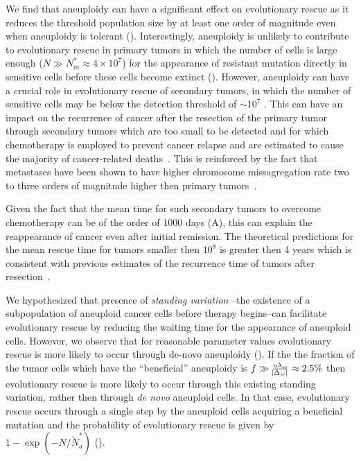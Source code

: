 \documentclass[12pt]{extarticle}
\begin{document}
We find that aneuploidy can have a significant effect on evolutionary rescue as it reduces the threshold population size by at least one order of magnitude even when aneuploidy is tolerant (). Interestingly, aneuploidy is unlikely to contribute to evolutionary rescue in primary tumors in which the number of cells is large enough ($N\gg N_m^*\approx 4\times10^7$) for the appearance of resistant mutation directly in sensitive cells before these cells become extinct ().
However, aneuploidy can have a crucial role in evolutionary rescue of secondary tumors, in which the number of sensitive cells may be below the detection threshold of $\sim10^7$  \citep{bozic2013evolutionary}. This can have an impact on the recurrence of cancer after the resection of the primary tumor  through secondary tumors which are too small to be detected and for which chemotherapy is employed to prevent  cancer relapse and are estimated to cause the majority of cancer-related deaths~\citep{chaffer2011perspective}. This is reinforced by the fact that metastases have been shown to have higher chromosome missagregation rate two to three orders of magnitude higher then primary tumors~\citep{kimmel2023intra}.

Given the fact that the mean time for such secondary tumors to overcome chemotherapy can be of the order of 1000 days (A),
this can explain the reappearance of cancer even after initial remission. The theoretical predictions for the mean rescue time for tumors smaller then  $10^8$ is greater then 4 years which is consistent with previous estimates of the recurrence time of tumors after resection~\citep{avanzini2019cancer}. 

We hypothesized that presence of \emph{standing variation} 
--the existence of a subpopulation of aneuploid cancer cells before therapy begins--can facilitate evolutionary rescue by reducing the waiting time for the appearance of aneuploid cells. However, we observe that for reasonable parameter values evolutionary rescue is more likely to occur through de-novo aneuploidy (). If the the fraction of the tumor cells which have the ``beneficial'' aneuploidy is $f\gg\frac{u\lambda_w}{\abs{\Delta_w}}\approx2.5\%$ then evolutionary rescue is more likely to occur through this existing standing variation, rather then through \emph{de novo} aneuploid cells. In that case, evolutionary rescue occurs through a single step by the aneuploid cells acquiring a beneficial mutation and the probability of evolutionary rescue is given by $1-\exp\left(-N/\tilde{N}_a^*\right)$  ().
\end{document}
